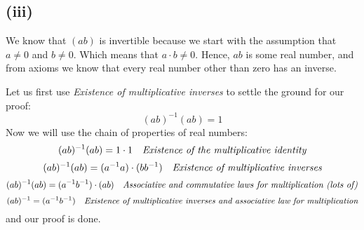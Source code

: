 \documentclass{article}
\begin{document}
\subsection*{(iii)}

We know that \((ab)\) is invertible because we start with the assumption that \(a \neq 0\) and \(b \neq 0\).
Which means that \(a \cdot b \neq 0\). Hence, \(ab\) is some real number, and from axioms we know that
every real number other than zero has an inverse.  

Let us first use \emph{Existence of multiplicative inverses} to settle the ground for our proof:
\begin{equation*}
	(ab)^{-1}(ab) = 1
\end{equation*}
Now we will use the chain of properties of real numbers:
\begin{equation*}
	(ab)^{-1}(ab) = 1 \cdot 1 \ \ \ \emph{Existence of the multiplicative identity}
\end{equation*}
\begin{equation*}
	(ab)^{-1}(ab) = (a^{-1}a) \cdot (bb^{-1}) \ \ \ \emph{Existence of multiplicative inverses}
\end{equation*}
\begin{equation*}
	(ab)^{-1}(ab) = (a^{-1}b^{-1}) \cdot (ab) \ \ \ \emph{Associative and commutative laws for multiplication (lots of)} 
\end{equation*}
\begin{equation*}
	(ab)^{-1} = (a^{-1}b^{-1}) \ \ \ \emph{Existence of multiplicative inverses and associative law for multiplication} 
\end{equation*}
and our proof is done.
\end{document}
